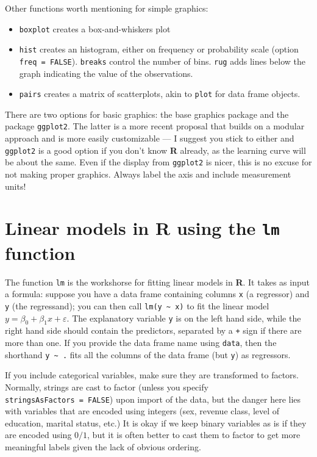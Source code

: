 \documentclass[
  11pt,
  letterpaper,
]{book}
\makeatletter
\providecommand{\tightlist}{%
  \setlength{\itemsep}{0pt}\setlength{\parskip}{0pt}}
\newenvironment{kframe}{%
\medskip{}
\setlength{\fboxsep}{.8em}
 \def\at@end@of@kframe{}%
 \ifinner\ifhmode%
  \def\at@end@of@kframe{\end{minipage}}%
  \begin{minipage}{\columnwidth}%
 \fi\fi%
 \def\FrameCommand##1{\hskip\@totalleftmargin \hskip-\fboxsep
 \colorbox{shadecolor}{##1}\hskip-\fboxsep
     \hskip-\linewidth \hskip-\@totalleftmargin \hskip\columnwidth}%
 \MakeFramed {\advance\hsize-\width
   \@totalleftmargin\z@ \linewidth\hsize
   \@setminipage}}%
 {\par\unskip\endMakeFramed%
 \at@end@of@kframe}
\newenvironment{rmdblock}[1]
  {
  \begin{itemize}
  \renewcommand{\labelitemi}{
    \raisebox{-.7\height}[0pt][0pt]{
      {\setkeys{Gin}{width=3em,keepaspectratio}\texttt{[image: images/\#1]}}
    }
  }
  \setlength{\fboxsep}{1em}
  \begin{kframe}
  \item
  }
  {
  \end{kframe}
  \end{itemize}
  }
\newenvironment{rmdnote}
  {\begin{rmdblock}{note}}
  {\end{rmdblock}}
\theoremstyle{definition}
\theoremstyle{definition}
\theoremstyle{definition}
\theoremstyle{definition}
\theoremstyle{remark}
\makeatother
\begin{document}
Other functions worth mentioning for simple graphics:

\begin{itemize}
\tightlist
\item
  \texttt{boxplot} creates a box-and-whiskers plot
\item
  \texttt{hist} creates an histogram, either on frequency or probability scale (option \texttt{freq\ =\ FALSE}). \texttt{breaks} control the number of bins. \texttt{rug} adds lines below the graph indicating the value of the observations.
\item
  \texttt{pairs} creates a matrix of scatterplots, akin to \texttt{plot} for data frame objects.
\end{itemize}

\begin{rmdnote}
There are two options for basic graphics: the base graphics package and the package \texttt{ggplot2}. The latter is a more recent proposal that builds on a modular approach and is more easily customizable --- I suggest you stick to either and \texttt{ggplot2} is a good option if you don't know \textbf{R} already, as the learning curve will be about the same. Even if the display from \texttt{ggplot2} is nicer, this is no excuse for not making proper graphics. Always label the axis and include measurement units!
\end{rmdnote}

\hypertarget{rlmfunc}{%
\section{\texorpdfstring{Linear models in \textbf{R} using the \texttt{lm} function}{Linear models in R using the lm function}}\label{rlmfunc}}

The function \texttt{lm} is the workshorse for fitting linear models in \textbf{R}. It takes as input a formula: suppose you have a data frame containing columns \texttt{x} (a regressor) and \texttt{y} (the regressand); you can then call \texttt{lm(y\ \textasciitilde{}\ x)} to fit the linear model \(y = \beta_0 + \beta_1 x + \varepsilon\). The explanatory variable \texttt{y} is on the left hand side,
while the right hand side should contain the predictors, separated by a \texttt{+} sign if there are more than one.
If you provide the data frame name using \texttt{data}, then the shorthand \texttt{y\ \textasciitilde{}\ .} fits all the columns of the data frame (but \texttt{y}) as regressors.

If you include categorical variables, make sure they are transformed to factors. Normally, strings are cast to factor (unless you specify \texttt{stringsAsFactors\ =\ FALSE}) upon import of the data, but the danger here lies with variables that are encoded using integers (sex, revenue class, level of education, marital status, etc.) It is okay if we keep binary variables as is if they are encoded using \(0/1\), but it is often better to cast them to factor to get more meaningful labels given the lack of obvious ordering.
\end{document}
